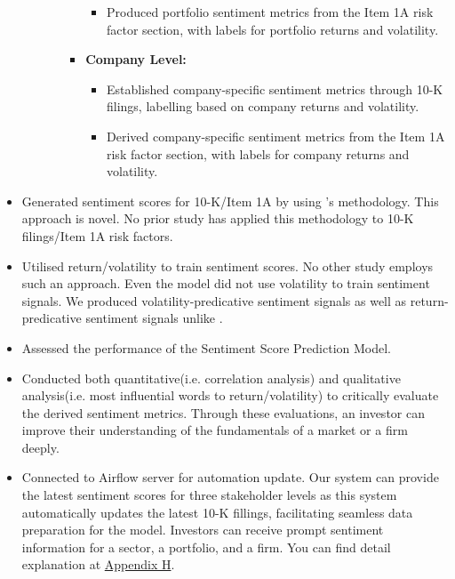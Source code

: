 \documentclass[logo,bsc,singlespacing,parskip]{infthesis}
\begin{document}
\begin{itemize}
\begin{itemize}
\begin{itemize}
\begin{itemize}
\begin{itemize}
                  \item Produced portfolio sentiment metrics from the Item 1A risk factor section, with labels for portfolio returns and volatility.
                \end{itemize}
              \item \textbf{Company Level:}
                \begin{itemize}
                  \item Established company-specific sentiment metrics through 10-K filings, labelling based on company returns and volatility.
                  \item Derived company-specific sentiment metrics from the Item 1A risk factor section, with labels for company returns and volatility.
                \end{itemize}
            \end{itemize}
        \end{itemize}
    \end{itemize}
    \item Generated sentiment scores for 10-K/Item 1A by using \cite{ke2020predicting}'s methodology. This approach is novel. No prior study has applied this methodology to 10-K filings/Item 1A risk factors. 
    \item Utilised return/volatility to train sentiment scores. No other study employs such an approach. Even the \cite{ke2020predicting} model did not use volatility to train sentiment signals. We produced volatility-predicative sentiment signals as well as return-predicative sentiment signals unlike \cite{ke2020predicting}.
    \item Assessed the performance of the Sentiment Score Prediction Model.
    \item Conducted both quantitative(i.e. correlation analysis) and qualitative analysis(i.e. most influential words to return/volatility) to critically evaluate the derived sentiment metrics. Through these evaluations, an investor can improve their understanding of the fundamentals of a market or a firm deeply.
    \item Connected to Airflow server for automation update. Our system can provide the latest sentiment scores for three stakeholder levels as this system automatically updates the latest 10-K fillings, facilitating seamless data preparation for the model. Investors can receive prompt sentiment information for a sector, a portfolio, and a firm. You can find detail explanation at \hyperref[appendix_airflow]{Appendix H}.

\end{itemize}
\end{document}
